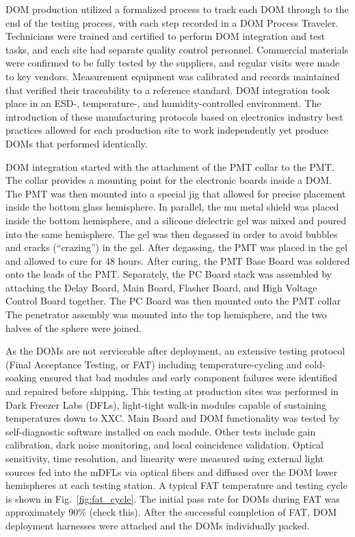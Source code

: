 DOM production utilized a formalized process to track each DOM through to
the end of the testing process, with each step recorded in a DOM Process
Traveler.  Technicians were trained and certified to perform DOM
integration and test tasks, and each site had separate quality control
personnel. Commercial materials were confirmed to be fully tested by the
suppliers, and regular visits were made to key vendors.  Measurement
equipment was calibrated and records maintained that verified their
traceability to a reference standard.  DOM integration took place in an
ESD-, temperature-, and humidity-controlled environment.  The introduction
of these manufacturing protocols based on electronics industry best
practices allowed for each production site to work independently yet
produce DOMs that performed identically.

DOM integration started with the attachment of the PMT collar
to the PMT.  The collar provides a mounting point for the electronic boards inside
a DOM. The PMT was then mounted into a special jig that allowed for precise
placement inside the bottom glass hemisphere.  In parallel, the mu metal
shield was placed inside the bottom hemisphere, and a silicone dielectric
gel was mixed and poured into the same hemisphere. The gel was then
degassed in order to avoid bubbles and cracks (``crazing'') in the gel.
After degassing, the PMT was placed in the gel and allowed to cure for 48
hours.  After curing, the PMT Base Board was soldered onto the leads of the
PMT.  Separately, the PC Board stack was assembled by attaching the Delay
Board, Main Board, Flasher Board, and High Voltage Control Board together.
The PC Board was then mounted onto the PMT collar The penetrator assembly
was mounted into the top hemisphere, and the two halves of the sphere were
joined. 

As the DOMs are not serviceable after deployment, an extensive testing
protocol (Final Acceptance Testing, or FAT) including temperature-cycling
and cold-soaking ensured that bad modules and early component failures were
identified and repaired before shipping.  This testing at production sites
was performed in Dark Freezer Labs (DFLs), light-tight walk-in 
modules capable of sustaining temperatures down to XXC.  Main Board
and DOM functionality was tested by self-diagnostic software installed on
each module.  Other tests include gain calibration, dark noise monitoring,
and local coincidence validation.  Optical sensitivity, time resolution,
and linearity were measured using external light sources fed into the mDFLs
via optical fibers and diffused over the DOM lower hemispheres at each
testing station.  A typical FAT temperature and testing cycle is shown in
Fig.~\ref{fig:fat_cycle}. The initial pass rate for DOMs during FAT 
was approximately 90\% (check this).  After the successful completion of
FAT, DOM deployment harnesses were attached and the DOMs individually
packed.


